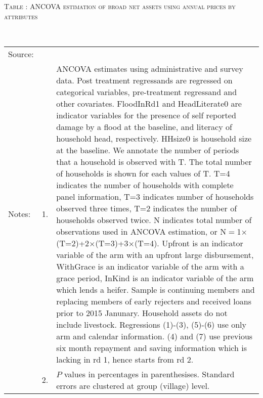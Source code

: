 \hspace{-1cm}\begin{minipage}[t]{14cm}
\hfil\textsc{\normalsize Table \thetable: ANCOVA estimation of broad net assets using annual prices by attributes\label{tab ANCOVA net assets using annual prices attributes}}\\
\setlength{\tabcolsep}{1pt}
\setlength{\baselineskip}{8pt}
\renewcommand{\arraystretch}{.55}
\hfil{}\\
\renewcommand{\arraystretch}{.8}
\setlength{\tabcolsep}{1pt}
\begin{tabular}{>{\hfill\scriptsize}p{1cm}<{}>{\hfill\scriptsize}p{.25cm}<{}>{\scriptsize}p{12cm}<{\hfill}}
Source:& \multicolumn{2}{l}{\scriptsize Estimated with GUK administrative and survey data.}\\
Notes: & 1. & ANCOVA estimates using administrative and survey data. Post treatment regressands are regressed on categorical variables, pre-treatment regressand and other covariates. \textsf{FloodInRd1} and \textsf{HeadLiterate0} are indicator variables for the presence of self reported damage by a flood at the baseline, and literacy of household head, respectively. \textsf{HHsize0} is household size at the baseline. We annotate the number of periods that a household is observed with \textsf{T}. The total number of households is shown for each values of \textsf{T}. \textsf{T=4} indicates the number of households with complete panel information, \textsf{T=3} indicates number of households observed three times, \textsf{T=2} indicates the number of households observed twice. \textsf{N} indicates total number of observations used in ANCOVA estimation, or \textsf{N$=$1$\times$(T=2)+2$\times$(T=3)+3$\times$(T=4)}.  \textsf{Upfront} is an indicator variable of the arm with an upfront large disbursement, \textsf{WithGrace} is an indicator variable of the arm with a grace period, \textsf{InKind} is an indicator variable of the arm which lends a heifer. Sample is continuing members and replacing members of early rejecters and received loans prior to 2015 Janunary. Household assets do not include livestock. Regressions (1)-(3), (5)-(6) use only arm and calendar information. (4) and (7) use previous six month repayment and saving information which is lacking in rd 1, hence starts from rd 2.\\
& 2. & $P$ values in percentages in parenthesises. Standard errors are clustered at group (village) level.
\end{tabular}
\end{minipage}

